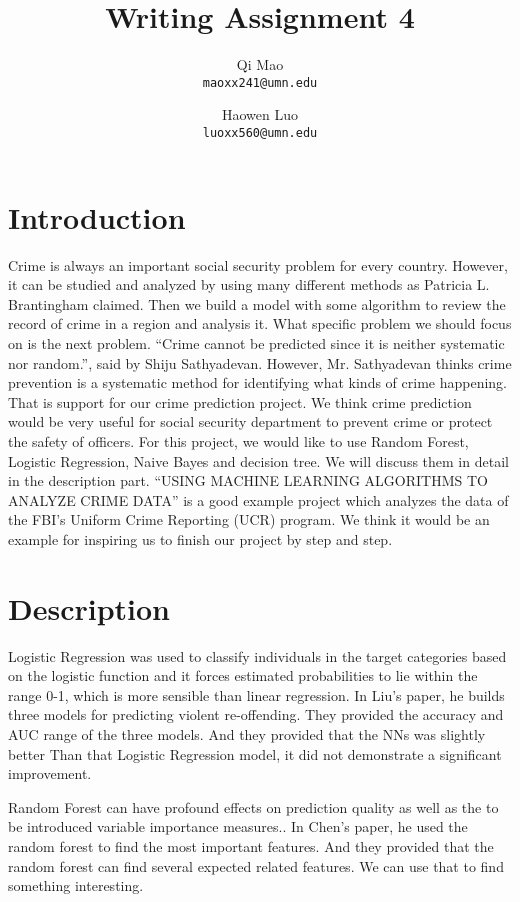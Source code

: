 \documentclass{article}
\begin{document}
\title{Writing Assignment 4}
\author{Qi Mao\\
  \texttt{maoxx241@umn.edu}
  \and
  Haowen Luo\\
  \texttt{luoxx560@umn.edu}
  }
\maketitle
\section{Introduction}
Crime is always an important social security problem for every country. However, it can be studied and analyzed by using many different methods as Patricia L. Brantingham claimed.\cite{brantingham1998mapping} Then we build a model with some algorithm to review the record of crime in a region and analysis it. What specific problem we should focus on is the next problem. “Crime cannot be predicted since it is neither systematic nor random.”, said by Shiju Sathyadevan.\cite{sathyadevan2014crime} However, Mr. Sathyadevan thinks crime prevention is a systematic method for identifying what kinds of crime happening. That is support for our crime prediction project. We think crime prediction would be very useful for social security department to prevent crime or protect the safety of officers. For this project, we would like to use Random Forest, Logistic Regression, Naive Bayes and decision tree. We will discuss them in detail in the description part. “USING MACHINE LEARNING ALGORITHMS TO ANALYZE CRIME DATA” is a good example project which analyzes the data of the FBI's Uniform Crime Reporting (UCR) program.\cite{mcclendon2015using} We think it would be an example for inspiring us to finish our project by step and step.

\section{Description}
Logistic Regression was used to classify individuals in the target categories based on the logistic function and it forces estimated probabilities to lie within the range 0-1, which is more sensible than linear regression.\cite{liu2011comparison}
In Liu's paper, he builds three models for predicting violent re-offending. They provided the accuracy and AUC range of the three models. And they provided that the NNs was slightly better Than that Logistic Regression model, it did not demonstrate a significant improvement.

Random Forest can have profound effects on prediction quality as well as the to be introduced variable importance measures.\cite{chen2016events}. In Chen's paper, he used the random forest to find the most important features. And they provided that the random forest can find several expected related features. We can use that to find something interesting.
\end{document}
